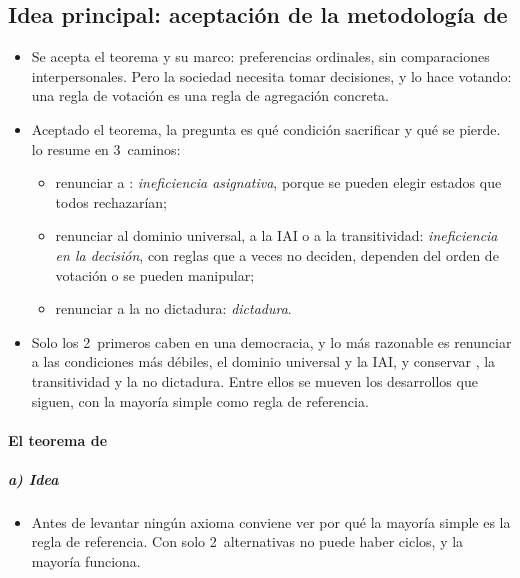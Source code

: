 \documentclass[11pt]{article}
\begin{document}
\subsection{Idea principal: aceptación de la metodología de }\label{sec:aceptacion}

\begin{itemize}
\item Se acepta el teorema y su marco: preferencias ordinales, sin comparaciones interpersonales. Pero la sociedad necesita tomar decisiones, y lo hace votando: una regla de votación es una regla de agregación concreta.
\item Aceptado el teorema, la pregunta es qué condición sacrificar y qué se pierde. \textcite[fig.~3.6, p.~693]{Inman1987Markets} lo resume en 3~caminos:
  \begin{itemize}
  \item renunciar a : \emph{ineficiencia asignativa}, porque se pueden elegir estados que todos rechazarían;
  \item renunciar al dominio universal, a la IAI o a la transitividad: \emph{ineficiencia en la decisión}, con reglas que a veces no deciden, dependen del orden de votación o se pueden manipular;
  \item renunciar a la no dictadura: \emph{dictadura}.
  \end{itemize}
\item Solo los 2~primeros caben en una democracia, y lo más razonable es renunciar a las condiciones más débiles, el dominio universal y la IAI, y conservar , la transitividad y la no dictadura. Entre ellos se mueven los desarrollos que siguen, con la mayoría simple como regla de referencia.
\end{itemize}

\paragraph{El teorema de }

\subparagraph{a) Idea}

\begin{itemize}
\item Antes de levantar ningún axioma conviene ver por qué la mayoría simple es la regla de referencia. Con solo 2~alternativas no puede haber ciclos, y la mayoría funciona.
\end{itemize}
\end{document}
